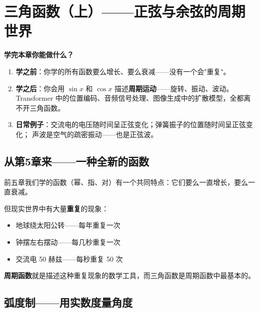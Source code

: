 
\chapter{三角函数（上）——正弦与余弦的周期世界}

\begin{applicationbox}
\textbf{学完本章你能做什么？}
\begin{enumerate}
  \item \textbf{学之前}：你学的所有函数要么增长、要么衰减——没有一个会"重复"。
  \item \textbf{学之后}：你会用 \(\sin x\) 和 \(\cos x\) 描述\textbf{周期运动}——旋转、振动、波动。
        Transformer 中的位置编码、音频信号处理、图像生成中的扩散模型，全都离不开三角函数。
  \item \textbf{日常例子}：交流电的电压随时间呈正弦变化；弹簧振子的位置随时间呈正弦变化；
        声波是空气的疏密振动——也是正弦波。
\end{enumerate}
\end{applicationbox}


\section{从第5章来——一种全新的函数}

前五章我们学的函数（幂、指、对）有一个共同特点：它们要么一直增长，要么一直衰减。

但现实世界中有大量\textbf{重复}的现象：
\begin{itemize}
  \item 地球绕太阳公转——每年重复一次
  \item 钟摆左右摆动——每几秒重复一次
  \item 交流电 50 赫兹——每秒重复 50 次
\end{itemize}

\textbf{周期函数}就是描述这种重复现象的数学工具，而三角函数是周期函数中最基本的。


\section{弧度制——用实数度量角度}


